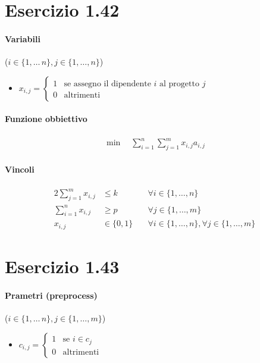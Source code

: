 \documentclass{article}
\begin{document}
\pagebreak
\section{Esercizio 1.42}

\paragraph{Variabili} ($i \in \{1,\ldots\,n\}, j \in \{1,\ldots,n\}$)
\begin{itemize}
  \item $x_{i,j} = \begin{cases}
      1 &\text{se assegno il dipendente }i\text{ al progetto }j\\
    0 &\text{altrimenti}
  \end{cases}$
\end{itemize}

\paragraph{Funzione obbiettivo}
\begin{align*}
  \min \quad \sum_{i=1}^n \sum_{j=1}^m x_{i,j} a_{i,j}
\end{align*}

\paragraph{Vincoli}
\begin{alignat}{2}
  \sum_{j=1}^m x_{i,j} &\leq k &\forall i \in \{1,\ldots,n\} \\
  \sum_{i=1}^n x_{i,j} &\geq p &\forall j \in \{1,\ldots,m\} \\
  x_{i,j} &\in \{0,1\} \quad &\forall i \in \{1,\ldots,n\}, \forall j \in \{1,\ldots,m\}
\end{alignat}

\pagebreak
\section{Esercizio 1.43}

\paragraph{Prametri (preprocess)} ($i \in \{1,\ldots\,n\}, j \in \{1,\ldots,m\}$)
\begin{itemize}
  \item $c_{i,j} = \begin{cases}
    1 &\text{se }i \in c_j\\
    0 &\text{altrimenti}
  \end{cases}$
\end{itemize}
\end{document}
